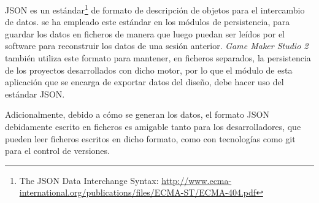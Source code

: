 JSON\cite{json} es un estándar\footnote{The JSON Data Interchange Syntax: \url{http://www.ecma-international.org/publications/files/ECMA-ST/ECMA-404.pdf}} de formato de descripción de objetos para el intercambio de datos.
se ha empleado este estándar en los módulos de persistencia, para guardar los datos en ficheros de manera que luego puedan ser leídos por el software para reconstruir los datos de una sesión anterior.
\textit{Game Maker Studio 2} también utiliza este formato para mantener, en ficheros separados, la persistencia de los proyectos desarrollados con dicho motor, por lo que el módulo de esta aplicación que se encarga de exportar datos del diseño, debe hacer uso del estándar JSON.

Adicionalmente, debido a cómo se generan los datos, el formato JSON debidamente escrito en ficheros es amigable tanto para los desarrolladores, que pueden leer ficheros escritos en dicho formato, como con tecnologías como git para el control de versiones.